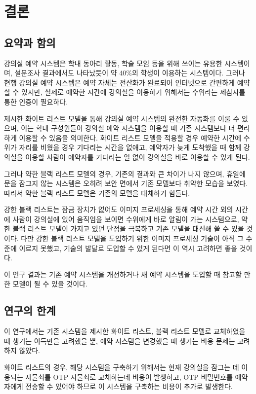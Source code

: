 \documentclass[11pt,a4paper]{article}
\begin{document}
\section{결론}

\subsection{요약과 함의}
강의실 예약 시스템은 학내 동아리 활동, 학술 모임 등을 위해 쓰이는 유용한
시스템이며, 설문조사 결과에서도 나타났듯이 약 40\%의 학생이 이용하는
시스템이다. 그러나 현행 강의실 예약 시스템은 예약 자체는 전산화가 완료되어
인터넷으로 간편하게 예약할 수 있지만, 실제로 예약한 시간에 강의실을 이용하기
위해서는 수위라는 제삼자를 통한 인증이 필요하다.

제시한 화이트 리스트 모델을 통해 강의실 예약 시스템의 완전한 자동화를 이룰 수
있으며, 이는 학내 구성원들이 강의실 예약 시스템을 이용할 때 기존 시스템보다 더
편리하게 이용할 수 있음을 의미한다. 화이트 리스트 모델을 적용할 경우 예약한
시간에 수위가 자리를 비웠을 경우 기다리는 시간을 없애고, 예약자가 늦게 도착했을
때 함께 강의실을 이용할 사람이 예약자를 기다리는 일 없이 강의실을 바로 이용할
수 있게 된다.

그러나 약한 블랙 리스트 모델의 경우, 기존의 결과와 큰 차이가 나지 않으며,
휴일에 문을 잠그지 않는 시스템은 오히려 보안 면에서 기존 모델보다 취약한 모습을
보였다. 따라서 약한 블랙 리스트 모델은 기존의 모델을 대체하기 힘들다.

강한 블랙 리스트는 잠금 장치가 없어도 이미지 프로세싱을 통해 예약 시간 외의
시간에 사람이 강의실에 있어 움직임을 보이면 수위에게 바로 알림이 가는
시스템으로, 약한 블랙 리스트 모델이 가지고 있던 단점을 극복하고 기존 모델을
대신해 쓸 수 있을 것이다. 다만 강한 블랙 리스트 모델을 도입하기 위한 이미지
프로세싱 기술이 아직 그 수준에 이르지 못했고, 기술의 발달로 도입할 수 있게
된다면 이 역시 고려하면 좋을 것이다.

이 연구 결과는 기존 예약 시스템을 개선하거나 새 예약 시스템을 도입할 때 참고할
만한 모델이 될 수 있을 것이다.

\subsection{연구의 한계}
이 연구에서는 기존 시스템을 제시한 화이트 리스트, 블랙 리스트 모델로 교체하였을
때 생기는 이득만을 고려했을 뿐, 예약 시스템을 변경했을 때 생기는 비용 문제는
고려하지 않았다.

화이트 리스트의 경우, 해당 시스템을 구축하기 위해서는 현재 강의실을 잠그는 데
이용되는 자물쇠를 OTP 자물쇠로 교체하는데 비용이 발생하고, OTP 비밀번호를
예약자에게 전송할 수 있어야 하므로 이 시스템을 구축하는 비용이 추가로 발생한다.
\end{document}
